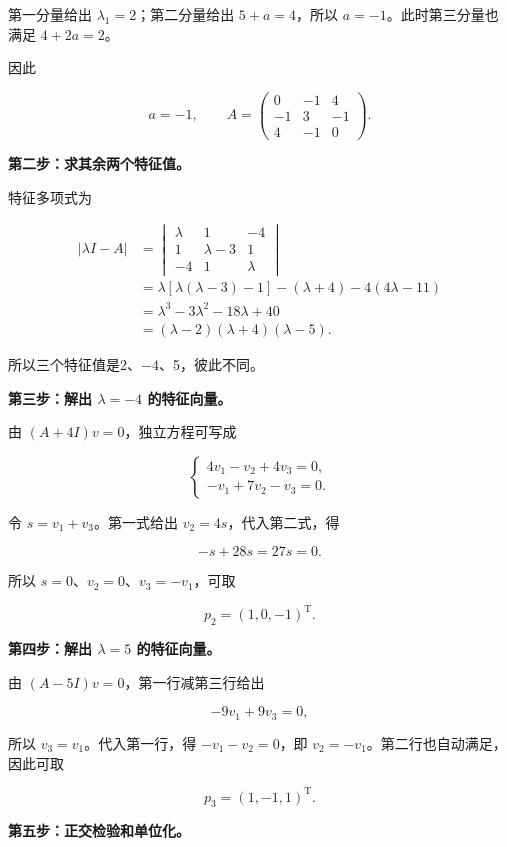 \documentclass[UTF8,11pt,fontset=windows]{ctexart}
\begin{document}
第一分量给出 $\lambda_1=2$；第二分量给出 $5+a=4$，所以 $a=-1$。此时第三分量也满足 $4+2a=2$。

因此

$$
\boxed{a=-1},\qquad
A=\begin{pmatrix}0&-1&4\\-1&3&-1\\4&-1&0\end{pmatrix}.
$$

\textbf{第二步：求其余两个特征值。}

特征多项式为

$$
\begin{aligned}
|\lambda I-A|
&=\begin{vmatrix}\lambda&1&-4\\1&\lambda-3&1\\-4&1&\lambda\end{vmatrix}\\
&=\lambda[\lambda(\lambda-3)-1]-(\lambda+4)-4(4\lambda-11)\\
&=\lambda^3-3\lambda^2-18\lambda+40\\
&=(\lambda-2)(\lambda+4)(\lambda-5).
\end{aligned}
$$

所以三个特征值是2、$-4$、5，彼此不同。

\textbf{第三步：解出 $\lambda=-4$ 的特征向量。}

由 $(A+4I)v=0$，独立方程可写成

$$
\begin{cases}
4v_1-v_2+4v_3=0,\\
-v_1+7v_2-v_3=0.
\end{cases}
$$

令 $s=v_1+v_3$。第一式给出 $v_2=4s$，代入第二式，得

$$
-s+28s=27s=0.
$$

所以 $s=0$、$v_2=0$、$v_3=-v_1$，可取

$$
p_2=(1,0,-1)^{\mathrm T}.
$$

\textbf{第四步：解出 $\lambda=5$ 的特征向量。}

由 $(A-5I)v=0$，第一行减第三行给出

$$
-9v_1+9v_3=0,
$$

所以 $v_3=v_1$。代入第一行，得 $-v_1-v_2=0$，即 $v_2=-v_1$。第二行也自动满足，因此可取

$$
p_3=(1,-1,1)^{\mathrm T}.
$$

\textbf{第五步：正交检验和单位化。}
\end{document}
